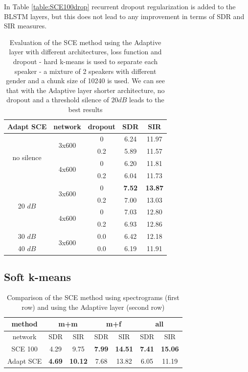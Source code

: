 \documentclass[master, tikz, final,11pt, dvipdfmx]{iscs-thesis}
\begin{document}
In Table \ref{table:SCE100drop} recurrent dropout regularization is added to the BLSTM layers, but this does not lead to any improvement in terms of SDR and SIR measures.

\begin{table}[h]
\centering
\begin{tabular}{c|c|c|c|c}
Adapt SCE & network & dropout & SDR & SIR \\ 
\hline
\multirow{4}{*}{no silence}  & \multirow{2}{*}{3x600} & 0 & 6.24 & 11.97 \\ 
\cline{3-5}
 &  & 0.2 & 5.89 & 11.57 \\
\cline{2-5}
 & \multirow{2}{*}{4x600} & 0 & 6.20 & 11.81 \\
\cline{3-5}
 &  & 0.2 & 6.04 & 11.73 \\
\hline
\multirow{4}{*}{20 $dB$}  & \multirow{2}{*}{3x600} & 0 & \textbf{7.52} & \textbf{13.87} \\ 
\cline{3-5}
 &  & 0.2 & 7.00 & 13.03 \\
\cline{2-5}
 & \multirow{2}{*}{4x600} & 0 & 7.03 & 12.80 \\
\cline{3-5}
 &  & 0.2 & 6.93 & 12.86 \\
\hline
30 $dB$ & \multirow{2}{*}{3x600} & 0.0 & 6.42 & 12.18 \\
\cline{1-1}\cline{3-5}
40 $dB$ &  & 0.0 & 6.19 & 11.91 \\
\end{tabular}
\captionsetup{justification=centering}
\caption{Evaluation of the SCE method using the Adaptive layer with different architectures, loss function and dropout - hard k-means is used to separate each speaker - a mixture of 2 speakers with different gender and a chunk size of 10240 is used. We can see that with the Adaptive layer shorter architecture, no dropout and a threshold silence of $20dB$ leads to the best results}
\label{table:AdaptSCE100drop}
\end{table}



\subsection{Soft k-means}
\label{softkmeans}

\begin{table}[h]
\centering
\begin{tabular}{c|c|c|c|c|c|c}
method & \multicolumn{2}{c|}{m+m} & \multicolumn{2}{c|}{m+f} & \multicolumn{2}{c}{all} \\ 
\hline 
network & SDR & SIR & SDR & SIR & SDR & SIR \\ 
\hline 
SCE 100 & 4.29 & 9.75 & \textbf{7.99} & \textbf{14.51} & \textbf{7.41} & \textbf{15.06} \\ 
Adapt SCE & \textbf{4.69} & \textbf{10.12} & 7.68 & 13.82 & 6.05 & 11.19 \\ 
\end{tabular}
\captionsetup{justification=centering}
\caption{Comparison of the SCE method using spectrograms (first row) and using the Adaptive layer (second row)}
\label{table:SCE100softrecap}
\end{table}
\end{document}
